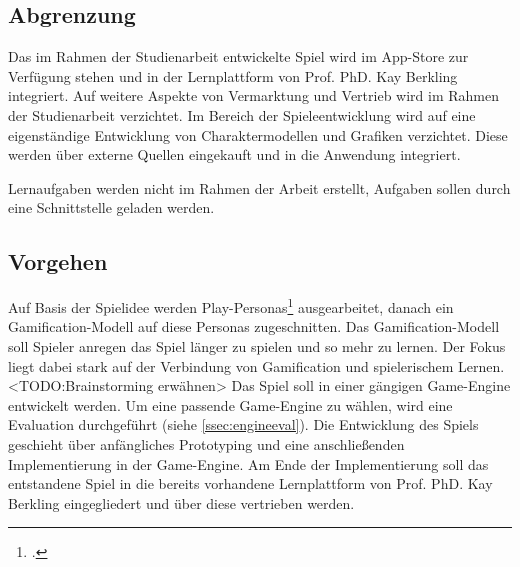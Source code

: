 \subsection{Abgrenzung}
	Das im Rahmen der Studienarbeit entwickelte Spiel wird im App-Store zur Verfügung stehen und in der Lernplattform von Prof. PhD. Kay Berkling integriert. Auf weitere Aspekte von Vermarktung und Vertrieb wird im Rahmen der Studienarbeit verzichtet.
	Im Bereich der Spieleentwicklung wird auf eine eigenständige Entwicklung von Charaktermodellen und Grafiken verzichtet. Diese werden über externe Quellen eingekauft und in die Anwendung integriert.

	Lernaufgaben werden nicht im Rahmen der Arbeit erstellt, Aufgaben sollen durch eine Schnittstelle geladen werden.

\subsection{Vorgehen}
	Auf Basis der Spielidee werden Play-Personas\footcite{persona} ausgearbeitet, danach ein Gamification-Modell auf diese Personas zugeschnitten. Das Gamification-Modell soll Spieler anregen das Spiel länger zu spielen und so mehr zu lernen. Der Fokus liegt dabei stark auf der Verbindung von Gamification und spielerischem Lernen.
	<TODO:Brainstorming erwähnen>
	Das Spiel soll in einer gängigen Game-Engine entwickelt werden. Um eine passende Game-Engine zu wählen, wird eine Evaluation durchgeführt (siehe \ref{ssec:engineeval}).
	Die Entwicklung des Spiels geschieht über anfängliches Prototyping und eine anschließenden Implementierung in der Game-Engine. Am Ende der Implementierung soll das entstandene Spiel in die bereits vorhandene Lernplattform von Prof. PhD. Kay Berkling eingegliedert und über diese vertrieben werden.
